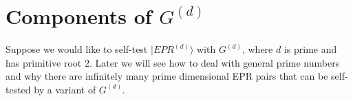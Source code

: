 \documentclass[11pt,letterpaper]{article}
\newcommand{\ket}[1]{|#1\rangle}
\DeclarePairedDelimiter{\set}{\lbrace}{\rbrace}
\DeclarePairedDelimiter{\ip}{\langle}{\rangle}
\newcommand{\Z}{\mathbb{Z}}
\newcommand{\1}{\mathbb{1}}
\newcommand{\J}{\mathcal{J}}
\newcommand{\EPR}[1]{EPR^{(#1)}}
\newcommand{\G}[1]{G^{(#1)}}
\newtheorem{definition}[theorem]{Definition}
\theoremstyle{definition}
\begin{document}
\section{Components of $\G{d}$}
Suppose we would like to self-test $\ket{\EPR{d}}$ with $\G{d}$, where $d$ is prime and has primitive root $2$.
Later we will see how to deal with general prime numbers and why there are infinitely many prime dimensional EPR pairs 
that can be self-tested by a variant of $\G{d}$.
\end{document}
